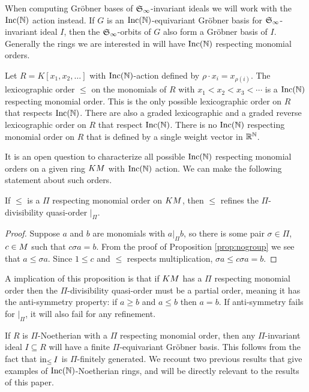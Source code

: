 When computing Gr\"obner bases of $\mathfrak S_\infty$-invariant ideals we will work with the $\operatorname{Inc}(\mathbb N)$ action instead.  If $G$ is an $\operatorname{Inc}(\mathbb N)$-equivariant Gr\"obner basis for $\mathfrak S_\infty$-invariant ideal $I$, then the $\mathfrak S_\infty$-orbits of $G$ also form a Gr\"obner basis of $I$.  Generally the rings we are interested in will have $\operatorname{Inc}(\mathbb N)$ respecting monomial orders.

\begin{example}
 Let $R = K[x_1,x_2,\ldots]$ with $\operatorname{Inc}(\mathbb N)$-action defined by $\rho \cdot x_i = x_{\rho(i)}$.  The lexicographic order $\leq$ on the monomials of $R$ with $x_1 < x_2 < x_3 < \cdots$ is a $\operatorname{Inc}(\mathbb N)$ respecting monomial order.  This is the only possible lexicographic order on $R$ that respects $\operatorname{Inc}(\mathbb N)$.  There are also a graded lexicographic and a graded reverse lexicographic order on $R$ that respect $\operatorname{Inc}(\mathbb N)$.  There is no $\operatorname{Inc}(\mathbb N)$ respecting monomial order on $R$ that is defined by a single weight vector in $\mathbb R^{\mathbb N}$.
\end{example}

It is an open question to characterize all possible $\operatorname{Inc}(\mathbb N)$ respecting monomial orders on a given ring $KM$ with $\operatorname{Inc}(\mathbb N)$ action.  We can make the following statement about such orders.

\begin{proposition}
 If $\leq$ is a $\Pi$ respecting monomial order on $KM$, then $\leq$ refines the $\Pi$-divisibility quasi-order $|_\Pi$.
\end{proposition}
\begin{proof}
 Suppose $a$ and $b$ are monomials with $a |_\Pi b$, so there is some pair $\sigma \in \Pi$, $c \in M$ such that $c\sigma a = b$.  From the proof of Proposition \ref{prop:nogroup} we see that $a \leq \sigma a$.  Since $1 \leq c$ and $\leq$ respects multiplication, $\sigma a \leq c\sigma a = b$.
\end{proof}

A implication of this proposition is that if $KM$ has a $\Pi$ respecting monomial order then the $\Pi$-divisibility quasi-order must be a partial order, meaning it has the anti-symmetry property: if $a \geq b$ and $a \leq b$ then $a = b$.  If anti-symmetry fails for $|_\Pi$, it will also fail for any refinement.

If $R$ is $\Pi$-Noetherian with a $\Pi$ respecting monomial order, then any $\Pi$-invariant ideal $I \subseteq R$ will have a finite $\Pi$-equivariant Gr\"obner basis.  This follows from the fact that $\operatorname{in}_{\leq} I$ is $\Pi$-finitely generated.  We recount two previous results that give examples of $\operatorname{Inc}(\mathbb N)$-Noetherian rings, and will be directly relevant to the results of this paper.

